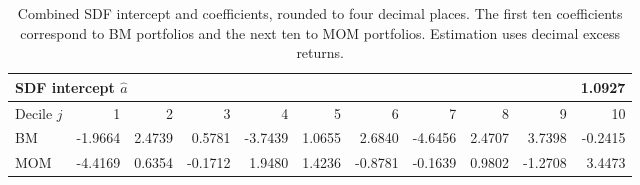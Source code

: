 \begin{table}[!htbp]
  \centering
  \caption{Combined SDF intercept and coefficients, rounded to four decimal
  places. The first ten coefficients correspond to BM portfolios and the
  next ten to MOM portfolios. Estimation uses decimal excess returns.}
  \label{tab:q2c-combined-sdf-parameters}
  \small
  \setlength{\tabcolsep}{3pt}
  \begin{tabular}{l*{10}{r}}
    \toprule
    \multicolumn{10}{l}{SDF intercept $\hat a$} & 1.0927 \\
    \midrule
    Decile $j$ & 1 & 2 & 3 & 4 & 5 & 6 & 7 & 8 & 9 & 10 \\
    \midrule
    BM & -1.9664 & 2.4739 & 0.5781 & -3.7439 & 1.0655 & 2.6840 & -4.6456 & 2.4707 & 3.7398 & -0.2415 \\
    MOM & -4.4169 & 0.6354 & -0.1712 & 1.9480 & 1.4236 & -0.8781 & -0.1639 & 0.9802 & -1.2708 & 3.4473 \\
    \bottomrule
  \end{tabular}
\end{table}
